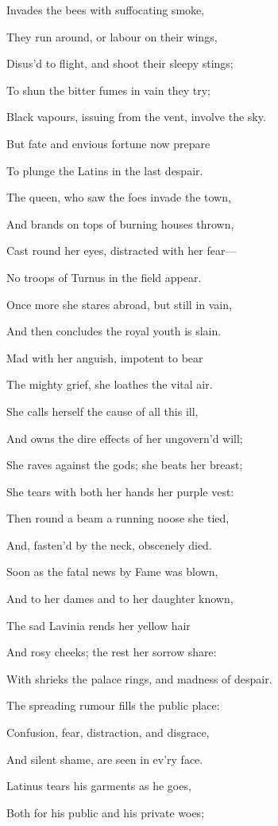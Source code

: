 Invades the bees with suffocating smoke,

They run around, or labour on their wings,

Disus’d to flight, and shoot their sleepy stings;

To shun the bitter fumes in vain they try;

Black vapours, issuing from the vent, involve the sky.

But fate and envious fortune now prepare

To plunge the Latins in the last despair.

The queen, who saw the foes invade the town,

And brands on tops of burning houses thrown,

Cast round her eyes, distracted with her fear—

No troops of Turnus in the field appear.

Once more she stares abroad, but still in vain,

And then concludes the royal youth is slain.

Mad with her anguish, impotent to bear

The mighty grief, she loathes the vital air.

She calls herself the cause of all this ill,

And owns the dire effects of her ungovern’d will;

She raves against the gods; she beats her breast;

She tears with both her hands her purple vest:

Then round a beam a running noose she tied,

And, fasten’d by the neck, obscenely died.

Soon as the fatal news by Fame was blown,

And to her dames and to her daughter known,

The sad Lavinia rends her yellow hair

And rosy cheeks; the rest her sorrow share:

With shrieks the palace rings, and madness of despair.

The spreading rumour fills the public place:

Confusion, fear, distraction, and disgrace,

And silent shame, are seen in ev’ry face.

Latinus tears his garments as he goes,

Both for his public and his private woes;

